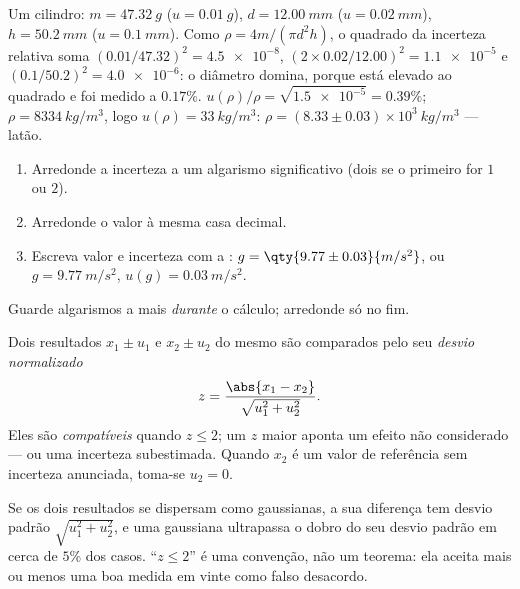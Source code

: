 \begin{example}\label{ex:b1:units-dimensions:density}
Um cilindro: $m = \qty{47.32}{g}$ ($u = \qty{0.01}{g}$),
$d = \qty{12.00}{mm}$ ($u = \qty{0.02}{mm}$), $h = \qty{50.2}{mm}$
($u = \qty{0.1}{mm}$). Como $\rho = 4m/(\pi d^2 h)$, o quadrado da
incerteza relativa soma $(0.01/47.32)^2 = \num{4.5e-8}$,
$(2 \times 0.02/12.00)^2 = \num{1.1e-5}$ e
$(0.1/50.2)^2 = \num{4.0e-6}$: o diâmetro domina, porque está elevado ao
quadrado e foi medido a $0.17\%$. $u(\rho)/\rho = \sqrt{\num{1.5e-5}}
= 0.39\%$; $\rho = \qty{8334}{kg/m^3}$, logo $u(\rho) = \qty{33}{kg/m^3}$:
$\rho = (8.33 \pm 0.03)\times10^3\ \unit{kg/m^3}$ --- latão.
\end{example}

\begin{method}\label{met:b1:units-dimensions:writing}
\begin{enumerate}
  \item Arredonde a incerteza a um algarismo significativo (dois se o
        primeiro for $1$ ou $2$).
  \item Arredonde o valor à mesma casa decimal.
  \item Escreva valor e incerteza com a :
        $g = \qty{9.77\pm0.03}{m/s^2}$, ou $g = \qty{9.77}{m/s^2}$,
        $u(g) = \qty{0.03}{m/s^2}$.
\end{enumerate}
Guarde algarismos a mais \emph{durante} o cálculo; arredonde só no fim.
\end{method}

\begin{definition}\label{def:b1:units-dimensions:zscore}
Dois resultados $x_1 \pm u_1$ e $x_2 \pm u_2$ do mesmo  são
comparados pelo seu \emph{desvio normalizado}
\[
z = \frac{\abs{x_1 - x_2}}{\sqrt{u_1^2 + u_2^2}} .
\]
Eles são \emph{compatíveis} quando $z \leq 2$; um $z$ maior aponta um
efeito não considerado --- ou uma incerteza subestimada. Quando $x_2$ é um
valor de referência sem incerteza anunciada, toma-se $u_2 = 0$.
\end{definition}

\begin{remark}\label{rem:b1:units-dimensions:why2}
Se os dois resultados se dispersam como gaussianas, a sua diferença tem
desvio padrão $\sqrt{u_1^2 + u_2^2}$, e uma gaussiana ultrapassa o dobro
do seu desvio padrão em cerca de $5\%$ dos casos. ``$z \leq 2$'' é uma
convenção, não um teorema: ela aceita mais ou menos uma boa medida em
vinte como falso desacordo.
\end{remark}

